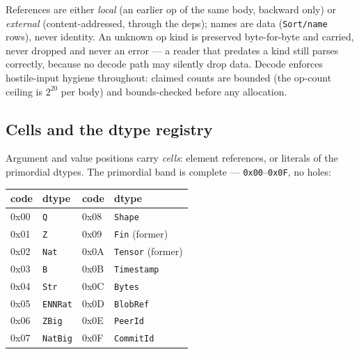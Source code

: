 \noindent References are either \emph{local} (an earlier op of the
same body, backward only) or \emph{external} (content-addressed,
through the deps); names are data (\texttt{Sort/name} rows), never
identity. An unknown op kind is preserved byte-for-byte and carried,
never dropped and never an error — a reader that predates a kind
still parses correctly, because no decode path may silently drop
data. Decode enforces hostile-input hygiene throughout: claimed
counts are bounded (the op-count ceiling is $2^{20}$ per body) and
bounds-checked before any allocation.

\subsection{Cells and the dtype registry}
\label{sec:gr-cells}

Argument and value positions carry \emph{cells}: element references,
or literals of the primordial dtypes. The primordial band is complete
— \texttt{0x00}–\texttt{0x0F}, no holes:

\begin{center}
\small
\begin{tabular}{llll}
\toprule
code & dtype & code & dtype \\
\midrule
0x00 & \texttt{Q} & 0x08 & \texttt{Shape} \\
0x01 & \texttt{Z} & 0x09 & \texttt{Fin} (former) \\
0x02 & \texttt{Nat} & 0x0A & \texttt{Tensor} (former) \\
0x03 & \texttt{B} & 0x0B & \texttt{Timestamp} \\
0x04 & \texttt{Str} & 0x0C & \texttt{Bytes} \\
0x05 & \texttt{ENNRat} & 0x0D & \texttt{BlobRef} \\
0x06 & \texttt{ZBig} & 0x0E & \texttt{PeerId} \\
0x07 & \texttt{NatBig} & 0x0F & \texttt{CommitId} \\
\bottomrule
\end{tabular}
\end{center}

